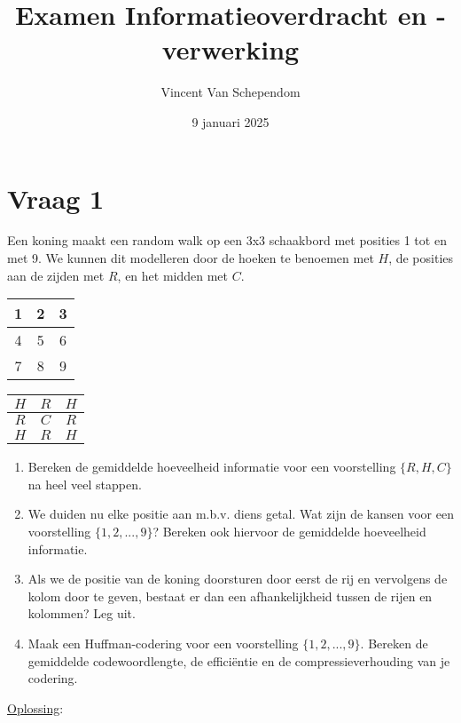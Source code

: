 \documentclass{kuburgiearticle}
\title{Examen Informatieoverdracht en -verwerking}
\author{Vincent Van Schependom}
\date{9 januari 2025}
\begin{document}
	\maketitle

	\section*{Vraag 1}

	Een koning maakt een random walk op een 3x3 schaakbord met posities 1 tot en met 9. We kunnen dit modelleren door de hoeken te benoemen met \(H\), de posities aan de zijden met \(R\), en het midden met \(C\).

	\renewcommand{\arraystretch}{1.5}
	\begin{table}[h!]
		\centering
		\begin{tabular}{|c|c|c|}
			\hline
			1 & 2 & 3 \\
			\hline
			4 & 5 & 6 \\
			\hline
			7 & 8 & 9 \\
			\hline
		\end{tabular}
		\hspace{2cm}
		\begin{tabular}{|c|c|c|}
			\hline
			\(H\) & \(R\) & \(H\) \\
			\hline
			\(R\) & \(C\) & \(R\) \\
			\hline
			\(H\) & \(R\) & \(H\) \\
			\hline
		\end{tabular}
	\end{table}

	\begin{enumerate}
		\item Bereken de gemiddelde hoeveelheid informatie voor een voorstelling \(\{R,H,C\}\) na heel veel stappen.
		\item We duiden nu elke positie aan m.b.v. diens getal. Wat zijn de kansen voor een voorstelling \(\{1,2,...,9\}\)? Bereken ook hiervoor de gemiddelde hoeveelheid informatie.
		\item Als we de positie van de koning doorsturen door eerst de rij en vervolgens de kolom door te geven, bestaat er dan een afhankelijkheid tussen de rijen en kolommen? Leg uit.
		\item Maak een Huffman-codering voor een voorstelling \(\{1,2,...,9\}\). Bereken de gemiddelde codewoordlengte, de efficiëntie en de compressieverhouding van je codering.
	\end{enumerate}

	\underline{Oplossing}:
\end{document}
